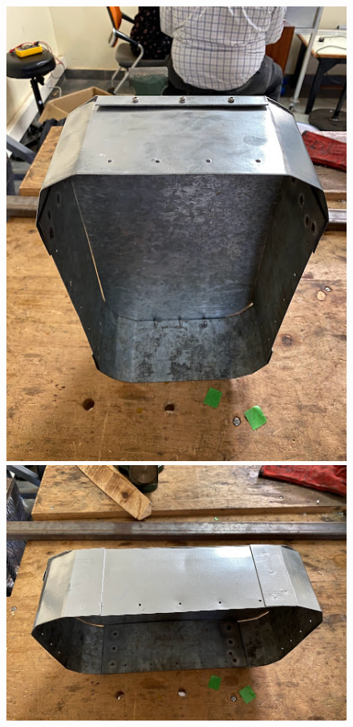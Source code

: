 \begin{figure}[H]
    \centering
    \includegraphics[scale = 0.35]{Figures/bodyFABRICATEDfront.jpg}
    \includegraphics[scale = 0.30]{Figures/bodyFABRICATEDside.jpg}

\end{figure}
